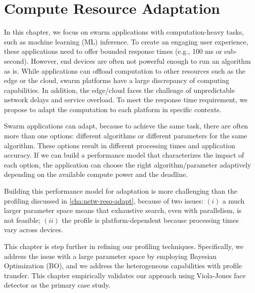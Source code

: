 \documentclass[thesis.tex]{subfiles}
\begin{document}
\chapter{Compute Resource Adaptation}
\label{cha:comp-reso-adapt}

In this chapter, we focus on swarm applications with computation-heavy tasks,
such as machine learning (ML) inference. To create an engaging user experience,
these applications need to offer bounded response times (e.g., 100 ms or
sub-second). However, end devices are often not powerful enough to run an
algorithm as is. While applications can offload computation to other resources
such as the edge or the cloud, swarm platforms have a large discrepancy of
computing capabilities. In addition, the edge/cloud faces the challenge of
unpredictable network delays and service overload. To meet the response time
requirement, we propose to adapt the computation to each platform in specific
contexts.

Swarm applications can adapt, because to achieve the same task, there are often
more than one options: different algorithms or different parameters for the same
algorithm. These options result in different processing times and application
accuracy. If we can build a performance model that characterizes the impact of
each option, the application can choose the right algorithm/parameter adaptively
depending on the available compute power and the deadline.

Building this performance model for adaptation is more challenging than the
profiling discussed in \autoref{cha:netw-reso-adapt}, because of two issues:
$(i)$ a much larger parameter space means that exhaustive search, even with
parallelism, is not feasible; $(ii)$ the profile is platform-dependent because
processing times vary across devices.

This chapter is step further in refining our profiling techniques. Specifically,
we address the issue with a large parameter space by employing Bayesian
Optimization (BO), and we address the heterogeneous capabilities with profile
transfer. This chapter empirically validates our approach using Viola-Jones face
detector as the primary case study.






\end{document}
